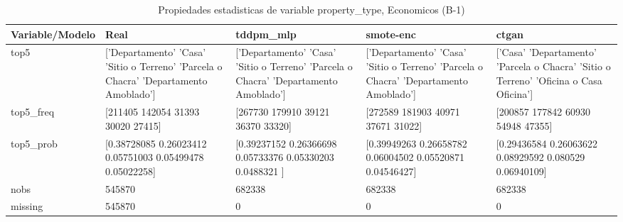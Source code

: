 \begin{table}[H]
\centering
\fontsize{8}{14}\selectfont
\caption{Propiedades  estadisticas de variable property\_type, Economicos (B-1)}
\label{table-stats-economicos-b-1-property_type}
\begin{tabular}{|l|m{10em}|m{10em}|m{10em}|m{10em}|}
\hline
 \rowcolor[gray]{0.8}
Variable/Modelo & Real & tddpm\_mlp & smote-enc & ctgan \\
\hline top5 & ['Departamento' 'Casa' 'Sitio o Terreno' 'Parcela o Chacra'
 'Departamento Amoblado'] & ['Departamento' 'Casa' 'Sitio o Terreno' 'Parcela o Chacra'
 'Departamento Amoblado'] & ['Departamento' 'Casa' 'Sitio o Terreno' 'Parcela o Chacra'
 'Departamento Amoblado'] & ['Casa' 'Departamento' 'Parcela o Chacra' 'Sitio o Terreno'
 'Oficina o Casa Oficina'] \\
\hline top5\_freq & [211405 142054  31393  30020  27415] & [267730 179910  39121  36370  33320] & [272589 181903  40971  37671  31022] & [200857 177842  60930  54948  47355] \\
\hline top5\_prob & [0.38728085 0.26023412 0.05751003 0.05499478 0.05022258] & [0.39237152 0.26366698 0.05733376 0.05330203 0.0488321 ] & [0.39949263 0.26658782 0.06004502 0.05520871 0.04546427] & [0.29436584 0.26063622 0.08929592 0.080529   0.06940109] \\
\hline nobs & 545870 & 682338 & 682338 & 682338 \\
\hline missing & 545870 & 0 & 0 & 0 \\
\hline
\end{tabular}
\end{table}
